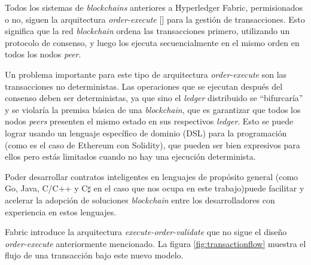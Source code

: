 
Todos los sistemas de \textit{blockchains} anteriores a Hyperledger Fabric, permisionados o no, siguen la arquitectura  \textit{order-execute} [\cite{hlf-paper}] para la gestión de transacciones. Esto significa que la red \textit{blockchain} ordena las transacciones primero, utilizando un protocolo de consenso, y luego los ejecuta secuencialmente en el mismo orden en todos los nodos \textit{peer}.


Un problema importante para este tipo de arquitectura \textit{order-execute} son las transacciones no deterministas. Las operaciones que se ejecutan después del consenso deben ser deterministas, ya que sino el \textit{ledger} distribuido se “bifurcaría” y se violaría la premisa básica de una \textit{blockchain}, que es garantizar que todos los nodos \textit{peers} presenten el mismo estado en sus respectivos \textit{ledger}. Esto se puede lograr usando un lenguaje específico de dominio (DSL) para la programación (como es el caso de Ethereum con Solidity), que pueden ser bien expresivos para ellos pero estás limitados cuando no hay una ejecución determinista.

Poder desarrollar contratos inteligentes en lenguajes de propósito general (como Go, Java, C/C++ y C$\sharp$ en el caso que nos ocupa en este trabajo)puede facilitar y acelerar la adopción de soluciones \textit{blockchain} entre los desarrolladores con experiencia en estos lenguajes.


Fabric introduce la arquitectura \textit{execute-order-validate} que no sigue el diseño \textit{order-execute} anteriormente mencionado. La figura \ref{fig:transactionflow} muestra el flujo de una transacción bajo este nuevo modelo.\\[5cm]

